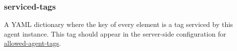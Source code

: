 \subsubsection{serviced-tags}\label{sec:agent-serviced-tags}
A YAML dictionary where the key of every element is a tag serviced by this agent instance.  This
tag should appear in the server-side configuration for \hyperref[sec:yaml-resolver-allowed-agent-tags]{allowed-agent-tags}.
